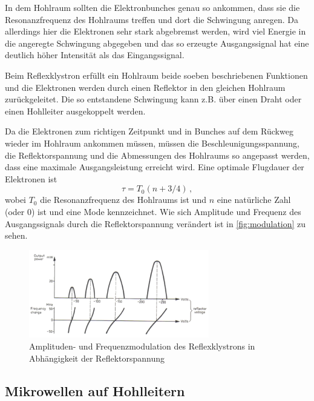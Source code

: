 In dem  Hohlraum sollten die Elektronbunches genau so ankommen, dass sie die Resonanzfrequenz des Hohlraums treffen und dort die Schwingung anregen.
Da allerdings hier die Elektronen sehr stark abgebremst werden, wird viel Energie in die angeregte Schwingung abgegeben 
und das so erzeugte Ausgangssignal hat eine deutlich höher Intensität als das Eingangssignal.

Beim Reflexklystron erfüllt ein Hohlraum beide soeben beschriebenen Funktionen und die Elektronen werden durch einen Reflektor in den gleichen Hohlraum zurückgeleitet.
Die so entstandene Schwingung kann z.B. über einen Draht oder einen Hohlleiter ausgekoppelt werden.

Da die Elektronen zum richtigen Zeitpunkt und in Bunches auf dem Rückweg wieder im Hohlraum ankommen müssen, 
müssen die Beschleunigungsspannung, die Reflektorspannung und die Abmessungen des Hohlraums
so angepasst werden, dass eine maximale Ausgangsleistung erreicht wird.
Eine optimale Flugdauer der Elektronen ist 
\begin{equation}
    \tau = T_0 (n+3/4) \, ,
\end{equation}
wobei $T_0$ die Resonanzfrequenz des Hohlraums ist und $n$ eine natürliche Zahl (oder 0) ist und eine Mode kennzeichnet.
Wie sich Amplitude und Frequenz des Ausgangssignals durch die Reflektorspannung verändert ist in \autoref{fig:modulation} zu sehen.

\begin{figure}
    \centering
    \includegraphics[width=0.7\textwidth]{images/modulation_white.png}
    \caption{Amplituden- und Frequenzmodulation des Reflexklystrons in Abhängigkeit der Reflektorspannung \cite{V53_old}}
    \label{fig:modulation}
\end{figure}

\subsection{Mikrowellen auf Hohlleitern}
\label{ssec:Hohlleiter}

